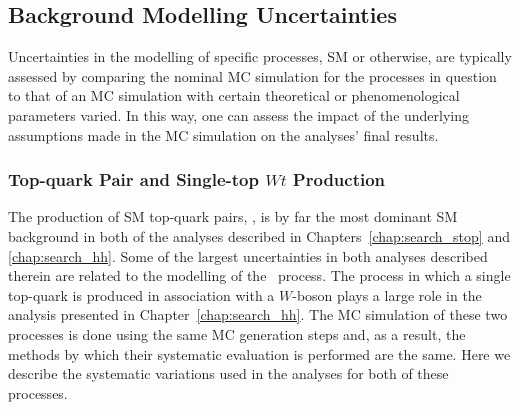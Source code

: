 %
%

\subsection{Background Modelling Uncertainties}
\label{sec:syst_bkg_modelling}

Uncertainties in the modelling of specific processes, SM or otherwise, are typically
assessed by comparing the nominal MC simulation for the processes in question to
that of an MC simulation with certain theoretical or phenomenological parameters varied.
In this way, one can assess the impact of the underlying assumptions made
in the MC simulation on the analyses' final results.

\subsubsection{Top-quark Pair and Single-top $Wt$ Production}
The production of SM top-quark pairs, \ttbar, is by far the most dominant SM background
in both of the analyses described in Chapters~\ref{chap:search_stop} and \ref{chap:search_hh}.
Some of the largest uncertainties in both analyses described therein are related to the modelling
of the \ttbar~process.
The process in which a single top-quark is produced in association with a $W$-boson plays a large
role in the analysis presented in Chapter~\ref{chap:search_hh}.
The MC simulation of these two processes is done using the same MC generation steps and, as a result,
the methods by which their systematic evaluation is performed are the same.
Here we describe the systematic variations used in the analyses for both of these processes.

